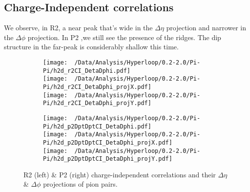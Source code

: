 \documentclass[12pt,a4paper,twoside]{report}
\begin{document}
\subsection{Charge-Independent correlations}
We observe, in R2, a near peak that's wide in the $\Delta\eta$ projection and narrower in the $\Delta\phi$ projection. In P2 ,we still see the presence of the ridges. The dip structure in the far-peak is considerably shallow this time.
\begin{figure}[H]
	\begin{subfigure}{0.49\linewidth}
		\texttt{[image: ~/Data/Analysis/Hyperloop/0.2-2.0/Pi-Pi/h2d\_r2CI\_DetaDphi.pdf]}\\
		\texttt{[image: ~/Data/Analysis/Hyperloop/0.2-2.0/Pi-Pi/h2d\_r2CI\_DetaDphi\_projX.pdf]}\\
		\texttt{[image: ~/Data/Analysis/Hyperloop/0.2-2.0/Pi-Pi/h2d\_r2CI\_DetaDphi\_projY.pdf]}\\
	\end{subfigure}
	\begin{subfigure}{0.49\linewidth}
		\texttt{[image: ~/Data/Analysis/Hyperloop/0.2-2.0/Pi-Pi/h2d\_p2DptDptCI\_DetaDphi.pdf]}\\
		\texttt{[image: ~/Data/Analysis/Hyperloop/0.2-2.0/Pi-Pi/h2d\_p2DptDptCI\_DetaDphi\_projX.pdf]}\\
		\texttt{[image: ~/Data/Analysis/Hyperloop/0.2-2.0/Pi-Pi/h2d\_p2DptDptCI\_DetaDphi\_projY.pdf]}\\
	\end{subfigure}
	\caption{R2 (left) \& P2 (right) charge-independent correlations and their $\Delta\eta$ \& $\Delta\phi$ projections of pion pairs.}
\end{figure}
\end{document}
